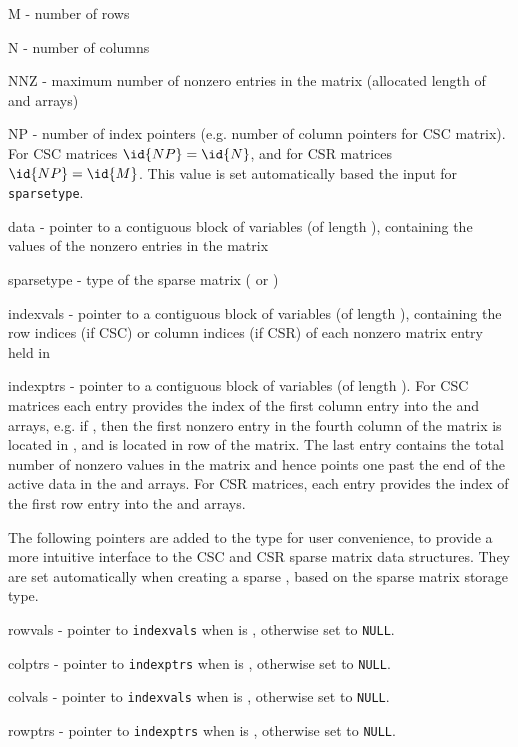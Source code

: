 \begin{args}[sparsetype]
  \item[M]  - number of rows
  \item[N]  - number of columns
  \item[NNZ]  - maximum number of nonzero entries in the matrix
    (allocated length of  and  arrays)
  \item[NP]  - number of index pointers (e.g. number of column pointers for 
    CSC matrix). For CSC matrices $\id{NP}=\id{N}$, and for CSR
    matrices $\id{NP}=\id{M}$. This value is set automatically based
    the input for \verb|sparsetype|.
  \item[data]  - pointer to a contiguous block of 
    variables (of length ), containing the values of the
    nonzero entries in the matrix
  \item[sparsetype]  - type of the sparse matrix ( or )
  \item[indexvals] - pointer to a contiguous block of  variables
    (of length ), containing the row indices (if CSC) or column
   indices (if CSR) of each nonzero matrix entry held in 
  \item[indexptrs]  - pointer to a contiguous block of 
    variables (of length ). For CSC matrices each 
    entry provides the index of the first column entry into the 
     and  arrays, e.g. if , then 
    the first nonzero entry in the fourth column of the matrix is 
    located in , and is located in row  of the 
    matrix.  The last entry contains the total number of nonzero values in 
    the matrix and hence points one past the end of the active data in the 
     and  arrays. For CSR matrices, each entry provides 
    the index of the first row entry into the  and  
    arrays.
\end{args}
\noindent The following pointers are added to the  type for
  user convenience, to provide a more intuitive interface to the CSC
  and CSR sparse matrix data structures. They are set automatically
  when creating a sparse {\sunmatrix}, based on the sparse matrix storage
  type.  
\begin{args}[colptrs]
  \item[rowvals] - pointer to \verb|indexvals| when  is ,
    otherwise set to \verb|NULL|.
  \item[colptrs] - pointer to \verb|indexptrs| when  is ,
    otherwise set to \verb|NULL|.
  \item[colvals] - pointer to \verb|indexvals| when  is ,
    otherwise set to \verb|NULL|.
  \item[rowptrs] - pointer to \verb|indexptrs| when  is ,
    otherwise set to \verb|NULL|.
\end{args}
